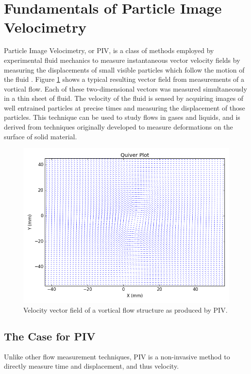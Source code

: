\section{Fundamentals of Particle Image Velocimetry}

Particle Image Velocimetry, or PIV, is a class of methods employed by 
experimental fluid mechanics to measure instantaneous vector velocity fields by 
measuring the displacements of small visible particles which follow the motion 
of the fluid \cite{adrian2011}. Figure \ref{fig:quiver_example} shows a typical 
resulting vector field from measurements of a vortical flow. Each of these 
two-dimensional vectors was measured simultaneously in a thin sheet of fluid. 
The velocity of the fluid is sensed by acquiring images of well entrained 
particles at precise times and measuring the displacement of those particles. 
This technique can be used to study flows in gases and liquids, and is derived 
from techniques originally developed to measure deformations on the surface of 
solid material.

\begin{figure}[H]
	\centering
	\includegraphics[width=5in]{figs/example_vortex_figs/example_quiver}
	\caption{Velocity vector field of a vortical flow structure as produced by 
	PIV.}
	\label{fig:quiver_example}
\end{figure}

 
\subsection{The Case for PIV}

Unlike other flow measurement techniques, PIV is a non-invasive method to 
directly measure time and displacement, and thus velocity.

